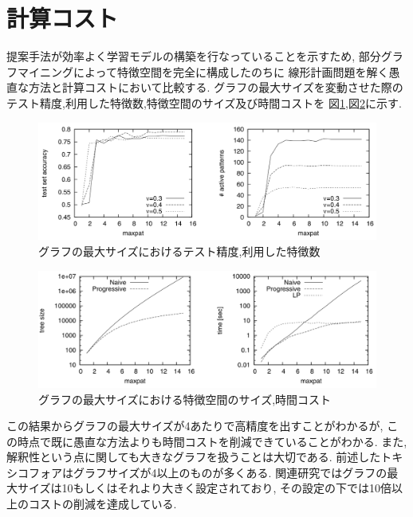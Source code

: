 \documentclass{zasshi-prml3}
\theoremstyle{definition}
\begin{document}
{\section{計算コスト}
提案手法が効率よく学習モデルの構築を行なっていることを示すため,
部分グラフマイニングによって特徴空間を完全に構成したのちに
線形計画問題を解く愚直な方法と計算コストにおいて比較する.
グラフの最大サイズを変動させた際のテスト精度,利用した特徴数,特徴空間のサイズ及び時間コストを
図\ref{maxpat_parameter},図\ref{costs}に示す.
\begin{figure}[t]
	\centering
	\includegraphics[width=150mm]{figure/maxpat_parameter.png}
	\caption{グラフの最大サイズにおけるテスト精度,利用した特徴数}
	\label{maxpat_parameter}
\end{figure}
\begin{figure}[t]
	\centering
	\includegraphics[width=150mm]{figure/costs.png}
	\caption{グラフの最大サイズにおける特徴空間のサイズ,時間コスト}
	\label{costs}
\end{figure}
この結果からグラフの最大サイズが4あたりで高精度を出すことがわかるが,
この時点で既に愚直な方法よりも時間コストを削減できていることがわかる.
また,解釈性という点に関しても大きなグラフを扱うことは大切である.
前述したトキシコフォアはグラフサイズが4以上のものが多くある.
関連研究ではグラフの最大サイズは10もしくはそれより大きく設定されており,
その設定の下では10倍以上のコストの削減を達成している.

}
\end{document}
